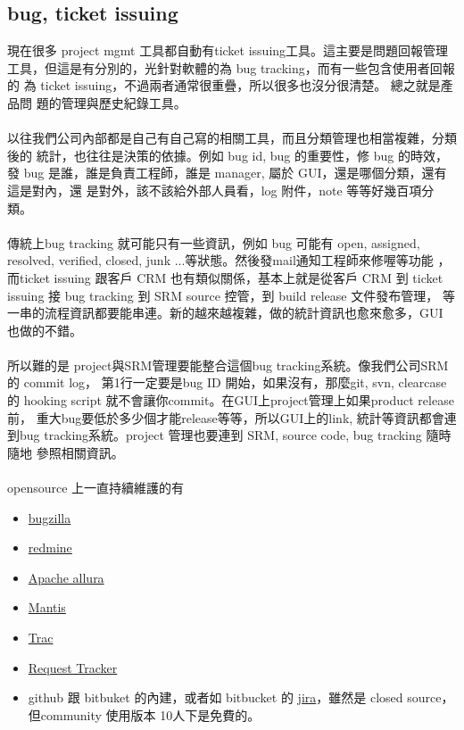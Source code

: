   \subsection{bug, ticket issuing}
  現在很多 project mgmt 工具都自動有ticket issuing工具。這主要是問題回報管理
  工具，但這是有分別的，光針對軟體的為 bug tracking，而有一些包含使用者回報的
  為 ticket issuing，不過兩者通常很重疊，所以很多也沒分很清楚。 總之就是產品問
  題的管理與歷史紀錄工具。 
  \\\\
  以往我們公司內部都是自己有自己寫的相關工具，而且分類管理也相當複雜，分類後的
  統計，也往往是決策的依據。例如 bug id, bug 的重要性，修 bug 的時效，發 bug
  是誰，誰是負責工程師，誰是 manager, 屬於 GUI，還是哪個分類，還有這是對內，還
  是對外，該不該給外部人員看，log 附件，note 等等好幾百項分類。
  \\\\
  傳統上bug tracking 就可能只有一些資訊，例如 bug 可能有 open, assigned, 
  resolved, verified, closed, junk ...等狀態。然後發mail通知工程師來修喔等功能
  ，而ticket issuing 跟客戶 CRM 也有類似關係，基本上就是從客戶 CRM 到 ticket
  issuing 接 bug tracking 到 SRM source 控管，到 build release 文件發布管理，
  等一串的流程資訊都要能串連。新的越來越複雜，做的統計資訊也愈來愈多，GUI
  也做的不錯。
  \\\\
  所以難的是 project與SRM管理要能整合這個bug tracking系統。像我們公司SRM 的
  commit log， 第1行一定要是bug ID 開始，如果沒有，那麼git, svn, clearcase 的
  hooking script 就不會讓你commit。在GUI上project管理上如果product release前，
  重大bug要低於多少個才能release等等，所以GUI上的link, 統計等資訊都會連到bug
  tracking系統。project 管理也要連到 SRM, source code, bug tracking 隨時隨地
  參照相關資訊。
  \\\\
  opensource 上一直持續維護的有
  \begin{itemize}
    \item \href{https://www.bugzilla.org/}{bugzilla}
    \item \href{https://redmine.org}{redmine}
    \item \href{https://allura.apache.org}{Apache allura}
    \item \href{https://www.mantisbt.org/}{Mantis}
    \item \href{https://trac.edgewall.org}{Trac}
    \item \href{https://bestpractical.com/request-tracker}{Request Tracker}
    \item github 跟 bitbuket 的內建，或者如 bitbucket 的 
      \href{https://www.atlassian.com/software/jira}{jira}，雖然是 closed
      source，但community 使用版本 10人下是免費的。
  \end{itemize}

